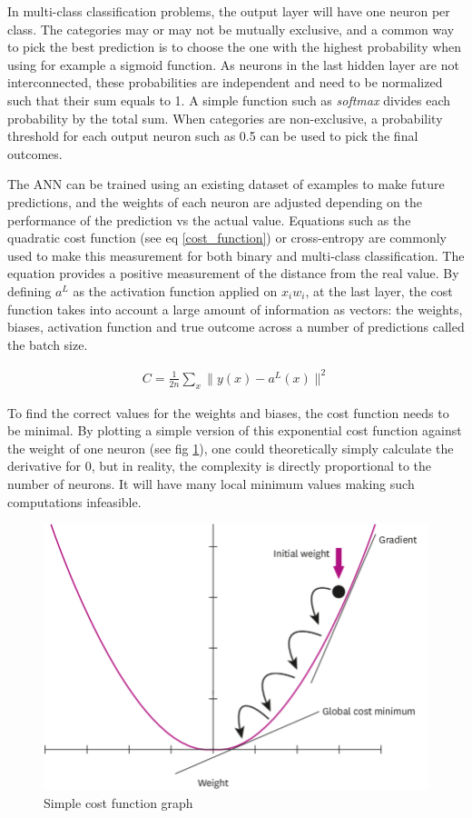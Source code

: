 \documentclass[proposal]{softeng}
\begin{document}
In multi-class classification problems, the output layer will have one neuron per class. The categories may or may not be mutually exclusive, and a common way to pick the best prediction is to choose the one with the highest probability when using for example a sigmoid function. As neurons in the last hidden layer are not interconnected, these probabilities are independent and need to be normalized such that their sum equals to 1. A simple function such as \textit{softmax} divides each probability by the total sum. When categories are non-exclusive, a probability threshold for each output neuron such as 0.5 can be used to pick the final outcomes.

The ANN can be trained using an existing dataset of examples to make future predictions, and the weights of each neuron are adjusted depending on the performance of the prediction vs the actual value. Equations such as the quadratic cost function (see eq \ref{cost_function}) or cross-entropy are commonly used to make this measurement for both binary and multi-class classification. The equation provides a positive measurement of the distance from the real value. By defining \( a^L  \) as the activation function applied on \( {x_{i}} {w_{i}} \), at the last layer, the cost function takes into account a large amount of information as vectors: the weights, biases, activation function and true outcome across a number of predictions called the batch size.

\begin{eqnarray}
\label{cost_function}
C = \frac{1}{2n} \sum_x \|y(x)-a^L(x)\|^2
\end{eqnarray}

To find the correct values for the weights and biases, the cost function needs to be minimal. By plotting a simple version of this exponential cost function against the weight of one neuron (see fig \ref{fig:costfuntiongraph}), one could theoretically simply calculate the derivative for 0, but in reality, the complexity is directly proportional to the number of neurons. It will have many local minimum values making such computations infeasible.

\begin{figure}[h!]
\centering
\includegraphics[scale=0.2]{images/A-graph-of-a-cost-function-modified-from.png}
\caption{Simple cost function graph\cite{costfuntion}}
\label{fig:costfuntiongraph}
\end{figure}
\end{document}
